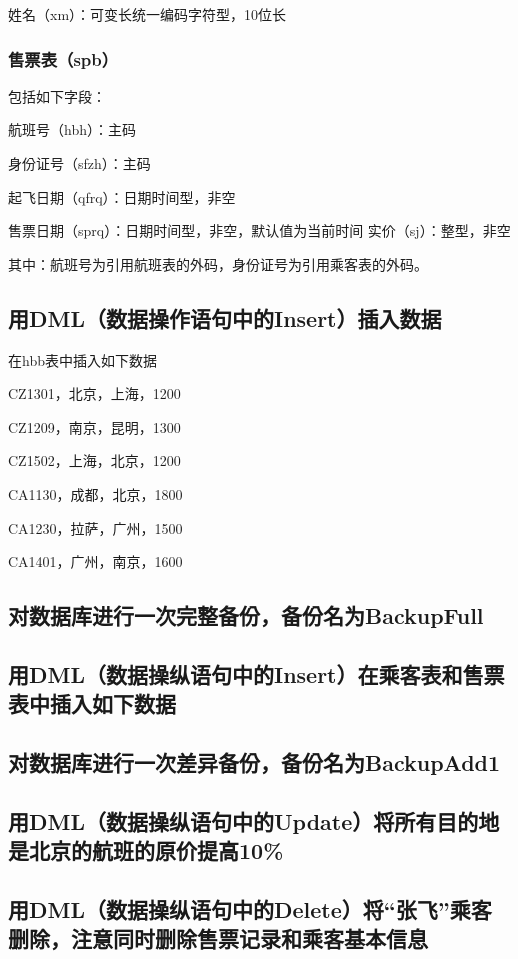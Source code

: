 \documentclass[UTF8,12pt]{article}
\begin{document}
姓名（xm）：可变长统一编码字符型，10位长

\subsubsection{售票表（spb）}
包括如下字段：

航班号（hbh）：主码 

身份证号（sfzh）：主码

起飞日期（qfrq）：日期时间型，非空

售票日期（sprq）：日期时间型，非空，默认值为当前时间
实价（sj）：整型，非空

其中：航班号为引用航班表的外码，身份证号为引用乘客表的外码。

\subsection{用DML（数据操作语句中的Insert）插入数据}
在hbb表中插入如下数据

CZ1301，北京，上海，1200

CZ1209，南京，昆明，1300

CZ1502，上海，北京，1200

CA1130，成都，北京，1800

CA1230，拉萨，广州，1500

CA1401，广州，南京，1600

\subsection{对数据库进行一次完整备份，备份名为BackupFull}

\subsection{用DML（数据操纵语句中的Insert）在乘客表和售票表中插入如下数据}

\subsection{对数据库进行一次差异备份，备份名为BackupAdd1}

\subsection{用DML（数据操纵语句中的Update）将所有目的地是北京的航班的原价提高10\%}

\subsection{用DML（数据操纵语句中的Delete）将“张飞”乘客删除，注意同时删除售票记录和乘客基本信息}
\end{document}

